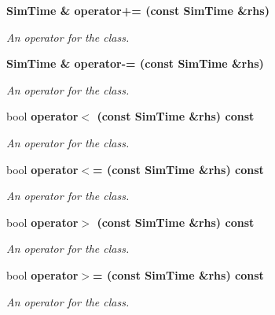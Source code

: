 \begin{Indent}{\bf }\par
\begin{CompactItemize}
\item 
\bf{Sim\-Time} \& \bf{operator+=} (const \bf{Sim\-Time} \&rhs)\label{classSimTime_b0162385e018569fd54932f20a9baa88}

\begin{CompactList}\small\item\em An operator for the class. \item\end{CompactList}\item 
\bf{Sim\-Time} \& \bf{operator-=} (const \bf{Sim\-Time} \&rhs)\label{classSimTime_6cd824edfd490b1083a4aec3be1935e9}

\begin{CompactList}\small\item\em An operator for the class. \item\end{CompactList}\item 
bool \bf{operator$<$} (const \bf{Sim\-Time} \&rhs) const \label{classSimTime_9a45054c3930595ce629b167f74c7cc9}

\begin{CompactList}\small\item\em An operator for the class. \item\end{CompactList}\item 
bool \bf{operator$<$=} (const \bf{Sim\-Time} \&rhs) const \label{classSimTime_ffd9218317db3e90935c62a83626cd28}

\begin{CompactList}\small\item\em An operator for the class. \item\end{CompactList}\item 
bool \bf{operator$>$} (const \bf{Sim\-Time} \&rhs) const \label{classSimTime_23fc71d5fa69974a96ed3dc89abc52db}

\begin{CompactList}\small\item\em An operator for the class. \item\end{CompactList}\item 
bool \bf{operator$>$=} (const \bf{Sim\-Time} \&rhs) const \label{classSimTime_af081bdc46f0aa1ab28aae99e31100a3}

\begin{CompactList}\small\item\em An operator for the class. \item\end{CompactList}\end{CompactItemize}
\end{Indent}


